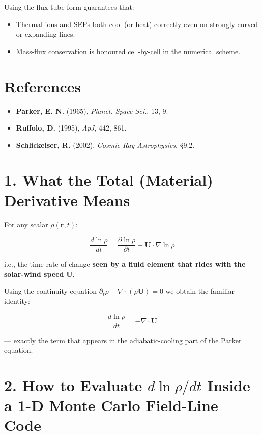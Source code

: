 Using the flux-tube form guarantees that:
\begin{itemize}
    \item Thermal ions and SEPs both cool (or heat) correctly even on strongly curved or expanding lines.
    \item Mass-flux conservation is honoured cell-by-cell in the numerical scheme.
\end{itemize}

\hrulefill

\section*{References}
\begin{itemize}
    \item \textbf{Parker, E. N.} (1965), \textit{Planet. Space Sci.}, 13, 9.
    \item \textbf{Ruffolo, D.} (1995), \textit{ApJ}, 442, 861.
    \item \textbf{Schlickeiser, R.} (2002), \textit{Cosmic-Ray Astrophysics}, \S9.2.
\end{itemize}


\section*{1. What the \textbf{Total (Material) Derivative} Means}

For any scalar $\rho(\mathbf{r}, t)$:

\begin{equation}
\boxed{\displaystyle
\frac{d\ln\rho}{dt} =
\frac{\partial\ln\rho}{\partial t} + \mathbf{U} \cdot \nabla \ln\rho
}
\tag{1}
\end{equation}

i.e., the time-rate of change \textbf{seen by a fluid element that rides with the solar-wind speed} $\mathbf{U}$.

Using the continuity equation $\partial_t \rho + \nabla \cdot (\rho \mathbf{U}) = 0$ we obtain the familiar identity:

\begin{equation}
\boxed{\displaystyle
\frac{d\ln\rho}{dt} = -\nabla \cdot \mathbf{U}
}
\tag{2}
\end{equation}

— exactly the term that appears in the adiabatic-cooling part of the Parker equation.

\hrulefill

\section*{2. How to Evaluate \texorpdfstring{$d\ln\rho/dt$}{} Inside a 1-D Monte Carlo Field-Line Code}

